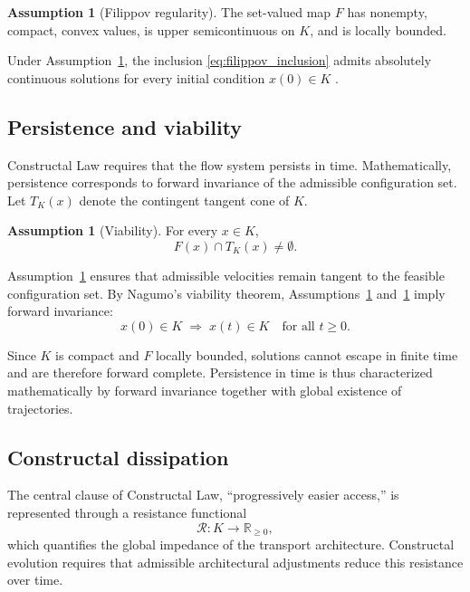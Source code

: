 \documentclass[12pt]{article}
\theoremstyle{plain}
\theoremstyle{definition}
\newtheorem{assumption}[theorem]{Assumption}
\theoremstyle{remark}
\begin{document}
\begin{assumption}[Filippov regularity]
\label{ass:filippov_regularity}
The set-valued map $F$ has nonempty, compact, convex values,
is upper semicontinuous on $K$, and is locally bounded.
\end{assumption}

Under Assumption~\ref{ass:filippov_regularity},
the inclusion \eqref{eq:filippov_inclusion} admits absolutely continuous
solutions for every initial condition $x(0)\in K$
\cite[Ch.~2]{Filippov1988}.

\subsection{Persistence and viability}

Constructal Law requires that the flow system persists in time.
Mathematically, persistence corresponds to forward invariance of the
admissible configuration set. Let $T_K(x)$ denote the contingent tangent cone of $K$.

\begin{assumption}[Viability]
\label{ass:viability}
For every $x\in K$,
\begin{equation}
F(x)\cap T_K(x)\neq\emptyset .
\label{eq:viability_condition}
\end{equation}
\end{assumption}

Assumption~\ref{ass:viability} ensures that admissible velocities remain
tangent to the feasible configuration set.
By Nagumo’s viability theorem,
Assumptions~\ref{ass:filippov_regularity} and~\ref{ass:viability}
imply forward invariance:
\begin{equation}
x(0)\in K
\;\Rightarrow\;
x(t)\in K
\quad\text{for all } t\ge0 .
\label{eq:forward_invariance}
\end{equation}

Since $K$ is compact and $F$ locally bounded, solutions cannot escape in
finite time and are therefore forward complete.
Persistence in time is thus characterized mathematically by forward
invariance together with global existence of trajectories.

\subsection{Constructal dissipation}

The central clause of Constructal Law,
``progressively easier access,''
is represented through a resistance functional
\[
\mathcal{R}:K\to\mathbb{R}_{\ge0},
\]
which quantifies the global impedance of the transport architecture. Constructal evolution requires that admissible architectural adjustments
reduce this resistance over time.
\end{document}
